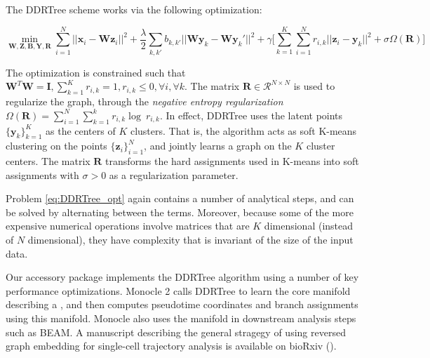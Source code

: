 \documentclass[10pt,oneside]{article}\usepackage[]{graphicx}\usepackage[]{color}
\begin{document}
The DDRTree scheme works via the following optimization:

\begin{equation}\label{eq:DDRTree_opt}
\mathop{min}_{\mathbf{W}, \mathbf{Z}, \mathbf{B}, \mathbf{Y}, \mathbf{R}} \sum_{i = 1}^N ||\mathbf{x}_i - \mathbf{W} \mathbf{z}_i||^2 +
\frac{\lambda}{2} \sum_{k, k'}b_{k, k'}||\mathbf{W} \mathbf{y}_k - \mathbf{W} \mathbf{y}_k'||^2 +
\gamma\Big[\sum_{k = 1}^K \sum_{i = 1}^N r_{i, k} ||\mathbf{z}_i - \mathbf{y}_k||^2 + \sigma \Omega (\mathbf{R})\Big]
\end{equation}

The optimization is constrained such that $\mathbf{W}^T \mathbf{W} = \mathbf{I}, \sum_{k = 1}^K r_{i, k} = 1,
r_{i, k} \leq 0, \forall i, \forall k$. The matrix $\mathbf{R} \in \mathcal{R}^{N \times N}$ is used to regularize the graph, through the \emph{negative
entropy regularization} $\Omega(\mathbf{R}) = \sum_{i = 1}^N \sum_{k = 1}^k r_{i, k} \log \ r_{i, k}$.  
In effect, DDRTree uses the latent points $\{\mathbf{y}_k\}_{k = 1}^K$ as the 
centers of $K$ clusters. That is, the algorithm acts as soft K-means clustering
on the points $\{\mathbf{z}_i\}^N_{i = 1}$, and jointly learns a graph on the $K$
cluster centers. The matrix $\mathbf{R}$ transforms the hard assignments used in 
K-means into soft assignments with $\sigma > 0$ as a regularization parameter. 

Problem \ref{eq:DDRTree_opt} again contains a number of analytical steps, and can be solved by
alternating between the terms. Moreover, because some of the  more expensive
numerical operations involve matrices that are $K$ dimensional (instead of $N$ dimensional), 
they have complexity that is invariant of the size of the input data. 

Our accessory package  implements the DDRTree algorithm using
a number of key performance optimizations. Monocle 2 calls DDRTree to learn the
core manifold describing a , and then computes pseudotime
coordinates and branch assignments using this manifold. Monocle also uses the 
manifold in downstream analysis steps such as BEAM. A manuscript describing the
general stragegy of using reversed graph embedding for single-cell trajectory
analysis is available on bioRxiv (\cite{Qiu2017-nx}).
\end{document}
